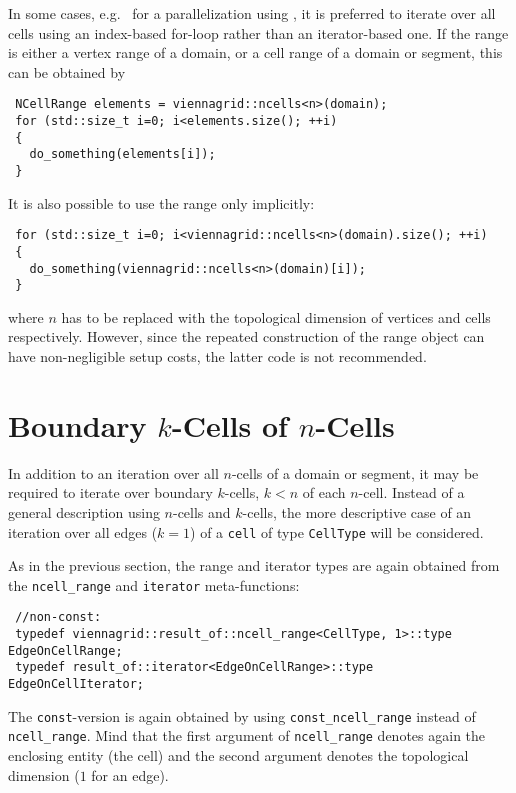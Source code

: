 In some cases, e.g.~ for a parallelization using \OpenMP \cite{openmp}, it is preferred to iterate over all cells using an index-based for-loop rather than an iterator-based one.
If the range is either a vertex range of a domain, or a cell range of a domain or segment, this can be obtained by
\begin{lstlisting}
 NCellRange elements = viennagrid::ncells<n>(domain);
 for (std::size_t i=0; i<elements.size(); ++i)
 { 
   do_something(elements[i]);
 }
\end{lstlisting}
It is also possible to use the range only implicitly:
\begin{lstlisting}
 for (std::size_t i=0; i<viennagrid::ncells<n>(domain).size(); ++i)
 {
   do_something(viennagrid::ncells<n>(domain)[i]);
 }
\end{lstlisting}
where $n$ has to be replaced with the topological dimension of vertices and cells respectively. However, since the repeated construction of the range object can have non-negligible setup costs, the latter code is not recommended.



\section{Boundary $k$-Cells of $n$-Cells}
In addition to an iteration over all $n$-cells of a domain or segment, it may be required to iterate over boundary $k$-cells, $k<n$ of each $n$-cell.
Instead of a general description using $n$-cells and $k$-cells, the more descriptive case of an iteration over all edges ($k=1$) of a \lstinline|cell| of type \lstinline|CellType| will be considered.


As in the previous section, the range and iterator types are again obtained from the \lstinline|ncell_range| and \lstinline|iterator| meta-functions:
\begin{lstlisting}
 //non-const:
 typedef viennagrid::result_of::ncell_range<CellType, 1>::type    EdgeOnCellRange;
 typedef result_of::iterator<EdgeOnCellRange>::type          EdgeOnCellIterator;
\end{lstlisting}
The \lstinline|const|-version is again obtained by using \lstinline|const_ncell_range| instead of \lstinline|ncell_range|.
Mind that the first argument of \lstinline|ncell_range| denotes again the enclosing entity (the cell) and the second argument denotes the topological dimension ($1$ for an edge).

